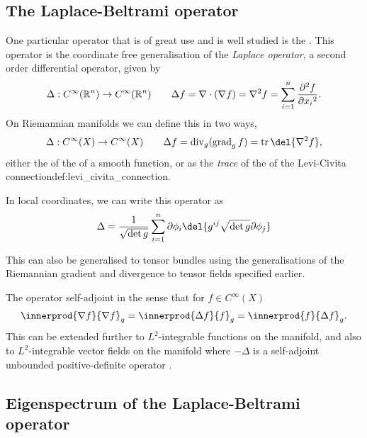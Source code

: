 \subsection{The Laplace-Beltrami operator}
One particular operator that is of great use and is well studied is the .
This operator is the coordinate free generalisation of the \emph{Laplace operator}, a second order differential operator, given by
\[
	\Delta: C^\infty(\R^n)\to C^\infty(\R^n) \quad \quad \Delta f = \nabla\cdot(\nabla f) = \nabla^2 f = \sum_{i=1}^n \pd[2]{f}{x_i}	
.\]
On Riemannian manifolds we can define this in two ways,
\[
	\Delta: C^\infty(X) \to C^\infty(X) \quad \quad \Delta f  = \dive_g(\grad_g f) = \tr\del{\nabla^2 f} \label{eq:laplace_beltrami_identity}
,\]
either the  of the  of a smooth function, or as the \emph{trace} of the  of the \emphhyperref
{Levi-Civita connection}{def:levi_civita_connection}.

In local coordinates, we can write this operator as
\[
	\Delta = \frac{1}{\sqrt{\det g}} \sum_{i=1}^n \partial\phi_i \del{g^{ij}\sqrt{\det g} \partial\phi_j}
\]

This can also be generalised to tensor bundles using the generalisations of the Riemannian gradient and divergence to tensor fields specified earlier.

The operator self-adjoint in the sense that for \(f\in C^\infty(X)\) \[\innerprod{\nabla f}{\nabla f}_g = \innerprod{\Delta f}{f}_g = \innerprod{f}{\Delta f}_g.\]
This can be extended further to \(L^2\)-integrable functions on the manifold, and also to \(L^2\)-integrable vector fields on the manifold where \(-\Delta\) is a self-adjoint unbounded positive-definite operator \cite[theorem 2.4]{strichartz1983analysis}.

\subsection{Eigenspectrum of the Laplace-Beltrami operator}
\label{sec:eigenf-eigenv-lapl}

